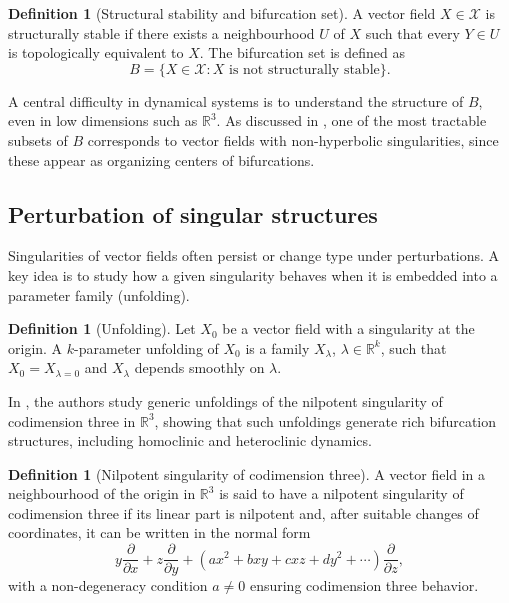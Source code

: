 \documentclass[12pt, a4paper, oneside]{book}
\theoremstyle{plain}
\theoremstyle{definition}
\newtheorem{definition}[theorem]{Definition}
\theoremstyle{remark}
\theoremstyle{definition}
\begin{document}
\begin{definition}[Structural stability and bifurcation set]
A vector field $X \in \mathcal{X}$ is structurally stable if there exists a neighbourhood $U$ of $X$ such that every $Y \in U$ is topologically equivalent to $X$. The bifurcation set is defined as
\[
B = \{ X \in \mathcal{X} : X \text{ is not structurally stable} \}.
\]
\end{definition}

A central difficulty in dynamical systems is to understand the structure of $B$, even in low dimensions such as $\mathbb{R}^3$. As discussed in \cite{ibanez2005shil}, one of the most tractable subsets of $B$ corresponds to vector fields with non-hyperbolic singularities, since these appear as organizing centers of bifurcations.

\subsection{Perturbation of singular structures}

Singularities of vector fields often persist or change type under perturbations. A key idea is to study how a given singularity behaves when it is embedded into a parameter family (unfolding).

\begin{definition}[Unfolding]
Let $X_0$ be a vector field with a singularity at the origin. A $k$-parameter unfolding of $X_0$ is a family $X_\lambda$, $\lambda \in \mathbb{R}^k$, such that $X_0 = X_{\lambda=0}$ and $X_\lambda$ depends smoothly on $\lambda$.
\end{definition}

In \cite{ibanez2005shil}, the authors study generic unfoldings of the nilpotent singularity of codimension three in $\mathbb{R}^3$, showing that such unfoldings generate rich bifurcation structures, including homoclinic and heteroclinic dynamics.

\begin{definition}[Nilpotent singularity of codimension three]
A vector field in a neighbourhood of the origin in $\mathbb{R}^3$ is said to have a nilpotent singularity of codimension three if its linear part is nilpotent and, after suitable changes of coordinates, it can be written in the normal form
\[
y\frac{\partial}{\partial x} + z\frac{\partial}{\partial y} + \left( ax^2 + bxy + cxz + dy^2 + \cdots \right)\frac{\partial}{\partial z},
\]
with a non-degeneracy condition $a \neq 0$ ensuring codimension three behavior.
\end{definition}
\end{document}
